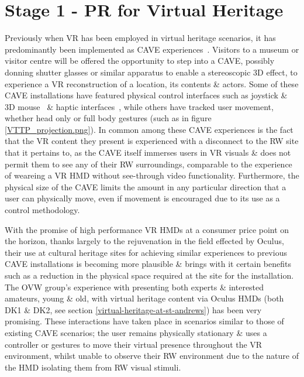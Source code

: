 
\section{Stage 1 - PR for Virtual Heritage}

Previously when VR has been employed in virtual heritage scenarios, it has predominantly been implemented as CAVE experiences~\cite{Roussou2002}. Visitors to a museum or visitor centre will be offered the opportunity to step into a CAVE, possibly donning shutter glasses or similar apparatus to enable a stereoscopic 3D effect, to experience a VR reconstruction of a location, its contents \& actors. Some of these CAVE installations have featured physical control interfaces such as joystick \& 3D mouse~\cite{cabral:x3dexperience} \& haptic interfaces~\cite{Christou2006}, while others have tracked user movement, whether head only or full body  gestures (such as in figure \ref{VTTP_projection.png}). In common among these CAVE experiences is the fact that the VR content they present is experienced with a disconnect to the RW site that it pertains to, as the CAVE itself immerses users in VR visuals \& does not permit them to see any of their RW surroundings, comparable to the experience of weareing a VR HMD without see-through video functionality. Furthermore, the physical size of the CAVE limits the amount in any particular direction that a user can physically move, even if movement is encouraged due to its use as a control methodology.

With the promise of high performance VR HMDs at a consumer price point on the horizon, thanks largely to the rejuvenation in the field effected by Oculus, their use at cultural heritage sites for achieving similar experiences to previous CAVE installations is becoming more plausible \& brings with it certain benefits such as a reduction in the physical space required at the site for the installation. The OVW group's experience with presenting both experts \& interested amateurs, young \& old, with virtual heritage content via Oculus HMDs (both DK1 \& DK2, see section \ref{virtual-heritage-at-st-andrews}) has been very promising. These interactions have taken place in scenarios similar to those of existing CAVE scenarios; the user remains physically stationary \& uses a controller or gestures to move their virtual presence throughout the VR environment, whilst unable to observe their RW environment due to the nature of the HMD isolating them from RW visual stimuli.

